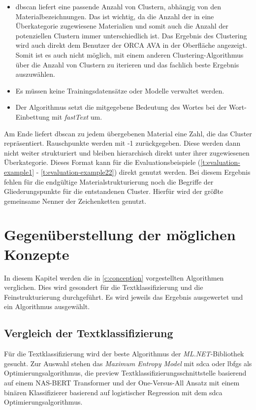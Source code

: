 \begin{itemize}
	\item \ac{dbscan} liefert eine passende Anzahl von Clustern, abhängig von den Materialbezeichnungen. Das ist wichtig, da die Anzahl der in eine Überkategorie zugewiesene Materialien und somit auch die Anzahl der potenziellen Clustern immer unterschiedlich ist. Das Ergebnis des Clustering wird auch direkt dem Benutzer der ORCA AVA in der Oberfläche angezeigt. Somit ist es auch nicht möglich, mit einem anderen Clustering-Algorithmus über die Anzahl von Clustern zu iterieren und das fachlich beste Ergebnis auszuwählen.
	\item Es müssen keine Trainingsdatensätze oder Modelle verwaltet werden.
	\item Der Algorithmus setzt die mitgegebene Bedeutung des Wortes bei der Wort-Einbettung mit \textit{fastText} um. 
\end{itemize}

Am Ende liefert \ac{dbscan} zu jedem übergebenen Material eine Zahl, die das Cluster repräsentiert. Rauschpunkte werden mit -1 zurückgegeben. Diese werden dann nicht weiter strukturiert und bleiben hierarchisch direkt unter ihrer zugewiesenen Überkategorie. Dieses Format kann für die Evaluationsbeispiele (\autoref{t:evaluation-example1} - \autoref{t:evaluation-example22}) direkt genutzt werden. Bei diesem Ergebnis fehlen für die endgültige Materialstrukturierung noch die Begriffe der Gliederungspunkte für die entstandenen Cluster. Hierfür wird der größte gemeinsame Nenner der Zeichenketten genutzt.

\chapter{Gegenüberstellung der möglichen Konzepte}
\label{c:comparison}
In diesem Kapitel werden die in \autoref{c:conception} vorgestellten Algorithmen verglichen.
Dies wird gesondert für die Textklassifizierung und die Feinstrukturierung durchgeführt. Es wird jeweils das Ergebnis ausgewertet und ein Algorithmus ausgewählt.

\section{Vergleich der Textklassifizierung}
\label{c:comparison:classification}
Für die Textklassifizierung wird der beste Algorithmus der \textit{ML.NET}-Bibliothek gesucht. Zur Auswahl stehen das \textit{Maximum Entropy Model} mit \ac{sdca} oder \ac{lbfgs} als Optimierungsalgorithmus, die preview Textklassifizierungsschnittstelle basierend auf einem NAS-BERT Transformer und der One-Versus-All Ansatz mit einem binären Klassifizierer basierend auf logistischer Regression mit dem \ac{sdca} Optimierungsalgorithmus.

